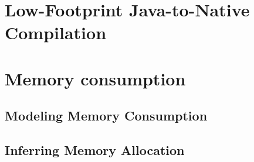 \section{Low-Footprint Java-to-Native Compilation}

\section{Memory consumption}

\subsection{Modeling Memory Consumption}\label{sec:verif}

\subsection{Inferring Memory Allocation}\label{sec:infer}


